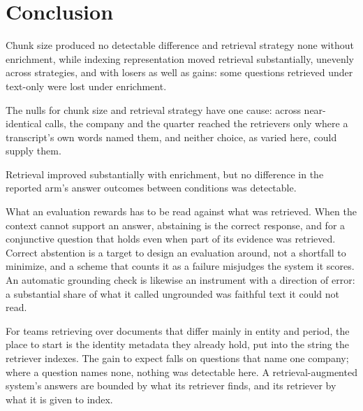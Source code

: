 \chapter{Conclusion}

Chunk size produced no detectable difference and retrieval strategy none without
enrichment, while indexing representation moved retrieval substantially, unevenly
across strategies, and with losers as well as gains: some questions retrieved
under text-only were lost under enrichment.

The nulls for chunk size and retrieval strategy have one cause: across
near-identical calls, the company and the quarter reached the retrievers only
where a transcript's own words named them, and neither choice, as varied here,
could supply them.

Retrieval improved substantially with enrichment, but no difference in the
reported arm's answer outcomes between conditions was detectable.

What an evaluation rewards has to be read against what was retrieved. When the
context cannot support an answer, abstaining is the correct response, and for a
conjunctive question that holds even when part of its evidence was retrieved.
Correct abstention is a target to design an evaluation around, not a shortfall
to minimize, and a scheme that counts it as a failure misjudges the system it
scores. An automatic grounding check is likewise an instrument with a direction
of error: a substantial share of what it called ungrounded was faithful text it
could not read.

For teams retrieving over documents that differ mainly in entity and period, the
place to start is the identity metadata they already hold, put into the string
the retriever indexes. The gain to expect falls on questions that name one
company; where a question names none, nothing was detectable here. A
retrieval-augmented system's answers are bounded by what
its retriever finds, and its retriever by what it is given to index.
